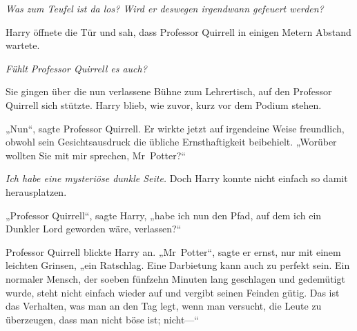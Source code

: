 \emph{Was zum Teufel ist da los? Wird er deswegen irgendwann gefeuert werden?}

Harry öffnete die Tür und sah, dass Professor Quirrell in einigen Metern Abstand wartete.

\emph{Fühlt Professor Quirrell es auch?}

Sie gingen über die nun verlassene Bühne zum Lehrertisch, auf den Professor Quirrell sich stützte. Harry blieb, wie zuvor, kurz vor dem Podium stehen.

„Nun“, sagte Professor Quirrell. Er wirkte jetzt auf irgendeine Weise freundlich, obwohl sein Gesichtsausdruck die übliche Ernsthaftigkeit beibehielt. „Worüber wollten Sie mit mir sprechen, Mr~Potter?“

\emph{Ich habe eine mysteriöse dunkle Seite.} Doch Harry konnte nicht einfach so damit herausplatzen.

„Professor Quirrell“, sagte Harry, „habe ich nun den Pfad, auf dem ich ein Dunkler Lord geworden wäre, verlassen?“

Professor Quirrell blickte Harry an. „Mr~Potter“, sagte er ernst, nur mit einem leichten Grinsen, „ein Ratschlag. Eine Darbietung kann auch zu perfekt sein. Ein normaler Mensch, der soeben fünfzehn Minuten lang geschlagen und gedemütigt wurde, steht nicht einfach wieder auf und vergibt seinen Feinden gütig. Das ist das Verhalten, was man an den Tag legt, wenn man versucht, die Leute zu überzeugen, dass man nicht böse ist; nicht—“

